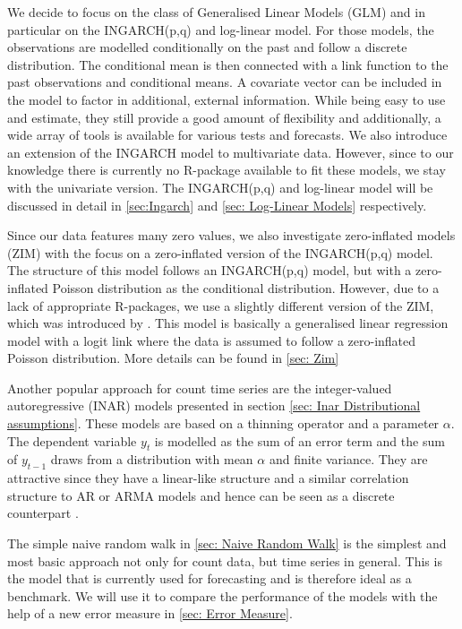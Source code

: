 We decide to focus on the class of Generalised Linear Models (GLM) and in particular on the INGARCH(p,q) and log-linear model. For those models, the observations are modelled conditionally on the past and follow a discrete distribution. The conditional mean is then connected with a link function to the past observations and conditional means. A covariate vector can be included in the model to factor in additional, external information. While being easy to use and estimate, they still provide a good amount of flexibility and additionally, a wide array of tools is available for various tests and forecasts. We also introduce an extension of the INGARCH model to multivariate data. However, since to our knowledge there is currently no R-package available to fit these models, we stay with the univariate version. The INGARCH(p,q) and log-linear model will be discussed in detail in \ref{sec:Ingarch} and \ref{sec: Log-Linear Models} respectively.

Since our data features many zero values, we also investigate zero-inflated models (ZIM) with the focus on a zero-inflated version of the INGARCH(p,q) model. The structure of this model follows an INGARCH(p,q) model, but with a zero-inflated Poisson distribution as the conditional distribution. However, due to a lack of appropriate R-packages, we use a slightly different version of the ZIM, which was introduced by \cite{Lambert:1992}. This model is basically a generalised linear regression model with a logit link where the data is assumed to follow a zero-inflated Poisson distribution. More details can be found in \ref{sec: Zim}

Another popular approach for count time series are the integer-valued autoregressive (INAR) models presented in section \ref{sec: Inar Distributional assumptions}. These models are based on a thinning operator and a parameter $\alpha$. The dependent variable $y_t$ is modelled as the sum of an error term and the sum of $y_{t-1}$ draws from a distribution with mean $\alpha$ and finite variance. They are attractive since they have a linear-like structure and a similar correlation structure to AR or ARMA models and hence can be seen as a discrete counterpart \cite{Heinen:2003}. 

The simple naive random walk in \ref{sec: Naive Random Walk} is the simplest and most basic approach not only for count data, but time series in general. This is the model that is currently used for forecasting and is therefore ideal as a benchmark. We will use it to compare the performance of the models with the help of a new error measure in \ref{sec: Error Measure}. 

